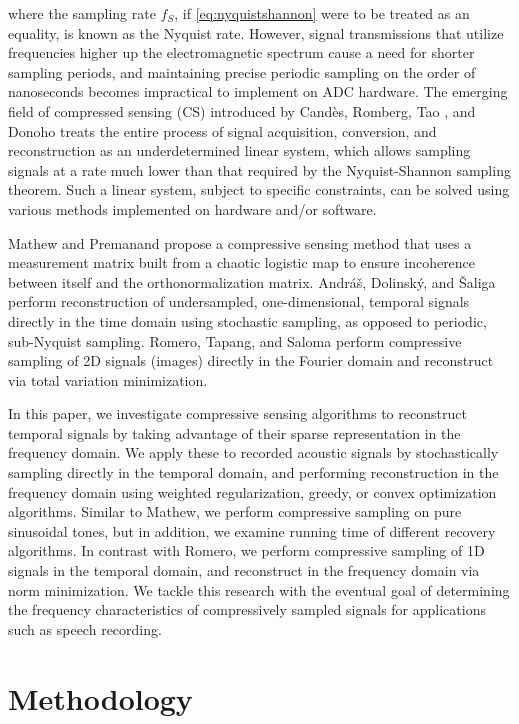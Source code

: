 \documentclass[10pt,a4paper,twoside]{article}
\begin{document}
where the sampling rate $f_S$, if \eqref{eq:nyquistshannon} were to be treated as an equality, is known as the Nyquist rate. However, signal transmissions that utilize frequencies higher up the electromagnetic spectrum cause a need for shorter sampling periods, and maintaining precise periodic sampling on the order of nanoseconds becomes impractical to implement on ADC hardware. The emerging field of compressed sensing (CS) introduced by Cand\`{e}s, Romberg, Tao \cite{candes}, and Donoho \cite{donoho} treats the entire process of signal acquisition, conversion, and reconstruction as an underdetermined linear system, which allows sampling signals at a rate much lower than that required by the Nyquist-Shannon sampling theorem. Such a linear system, subject to specific constraints, can be solved using various methods implemented on hardware and/or software.

Mathew and Premanand \cite{mathew} propose a compressive sensing method that uses a measurement matrix built from a chaotic logistic map to ensure incoherence between itself and the orthonormalization matrix. Andr\'{a}\v{s}, Dolinsk\'{y}, and \v{S}aliga \cite{andras} perform reconstruction of undersampled, one-dimensional, temporal signals directly in the time domain using stochastic sampling, as opposed to periodic, sub-Nyquist sampling. Romero, Tapang, and Saloma \cite{romero16,romero18} perform compressive sampling of 2D signals (images) directly in the Fourier domain and reconstruct via total variation minimization.

In this paper, we investigate compressive sensing algorithms to reconstruct temporal signals by taking advantage of their sparse representation in the frequency domain. We apply these to recorded acoustic signals by stochastically sampling directly in the temporal domain, and performing reconstruction in the frequency domain using weighted regularization, greedy, or convex optimization algorithms. Similar to Mathew, we perform compressive sampling on pure sinusoidal tones, but in addition, we examine running time of different recovery algorithms. In contrast with Romero, we perform compressive sampling of 1D signals in the temporal domain, and reconstruct in the frequency domain via norm minimization. We tackle this research with the eventual goal of determining the frequency characteristics of compressively sampled signals for applications such as speech recording.

\section{Methodology}\label{sec:Metho}
\medskip
\end{document}
